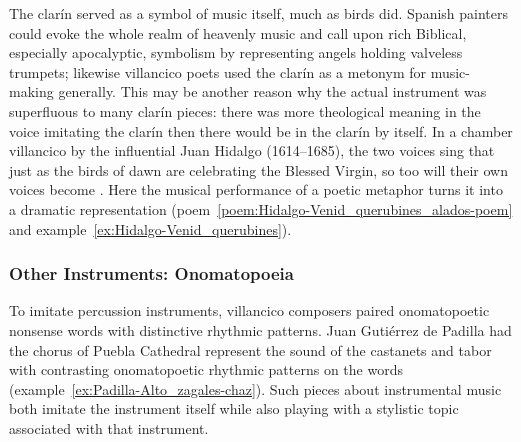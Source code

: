 The clarín served as a symbol of music itself, much as birds did.
Spanish painters could evoke the whole realm of heavenly music and call upon rich Biblical, especially apocalyptic, symbolism by representing angels holding valveless trumpets; likewise villancico poets used the clarín as a metonym for music-making generally.
This may be another reason why the actual instrument was superfluous to many clarín pieces: there was more theological meaning in the voice imitating the clarín then there would be in the clarín by itself.
In a chamber villancico by the influential Juan Hidalgo (1614--1685), the two voices sing that just as the birds of dawn are  celebrating the Blessed Virgin, so too will their own voices become .
Here the musical performance of a poetic metaphor turns it into a dramatic representation (poem~\ref{poem:Hidalgo-Venid_querubines_alados-poem} and example~\ref{ex:Hidalgo-Venid_querubines}).
%
%
%

\subsubsection{Other Instruments: Onomatopoeia}

To imitate percussion instruments, villancico composers paired onomatopoetic nonsense words with distinctive rhythmic patterns.
Juan Gutiérrez de Padilla had the chorus of Puebla Cathedral represent the sound of the castanets and tabor with contrasting onomatopoetic rhythmic patterns on the words  (example~\ref{ex:Padilla-Alto_zagales-chaz}).
Such pieces about instrumental music both imitate the instrument itself while also playing with a stylistic topic associated with that instrument.

